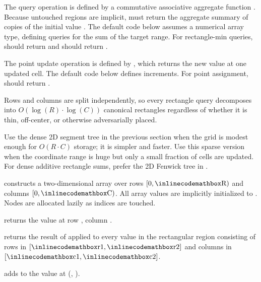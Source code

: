 The query operation is defined by a commutative associative aggregate function . Because untouched regions are implicit,  must return the aggregate summary of  copies of the initial value . The default code below assumes a numerical array type, defining queries for the sum of the target range. For rectangle-min queries,  should return  and  should return .

The point update operation is defined by , which returns the new value at one updated cell. The default code below defines increments. For point assignment,  should return .

Rows and columns are split independently, so every rectangle query decomposes into $O(\log\left(R\right) \cdot \log\left(C\right))$ canonical rectangles regardless of whether it is thin, off-center, or otherwise adversarially placed.

Use the dense 2D segment tree in the previous section when the grid is modest enough for $O(R \cdot C)$ storage; it is simpler and faster. Use this sparse version when the coordinate range is huge but only a small fraction of cells are updated. For dense additive rectangle sums, prefer the 2D Fenwick tree in .

\begin{compactitem}
  \item {} constructs a two-dimensional array over rows $[0, {\inlinecodemath{R}})$ and columns $[0, {\inlinecodemath{C}})$. All array values are implicitly initialized to . Nodes are allocated lazily as indices are touched.
  \item {} returns the value at row , column .
  \item {} returns the result of  applied to every value in the rectangular region consisting of rows in $[{\inlinecodemath{r1}}, {\inlinecodemath{r2}}]$ and columns in $[{\inlinecodemath{c1}}, {\inlinecodemath{c2}}]$.
  \item {} adds  to the value at (, ).
\end{compactitem}

